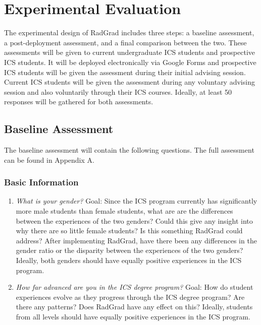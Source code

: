 \chapter{Experimental Evaluation}
\label{experimentalEvaluation}
The experimental design of RadGrad includes three steps: a baseline assessment, a post-deployment assessment, and a final comparison between the two. These assessments will be given to current undergraduate ICS students and prospective ICS students. It will be deployed electronically via Google Forms and prospective ICS students will be given the assessment during their initial advising session. Current ICS students will be given the assessment during any voluntary advising session and also voluntarily through their ICS courses. Ideally, at least 50 responses will be gathered for both assessments.
\section{Baseline Assessment}
\label{baselineAssessment}
	The baseline assessment will contain the following questions. The full assessment can be found in Appendix A. 

\subsection{Basic Information}
\begin{enumerate}
\item \textit{What is your gender? }
Goal: Since the ICS program currently has significantly more male students than female students, what are are the differences between the experiences of the two genders? Could this give any insight into why there are so little female students? Is this something RadGrad could address? After implementing RadGrad, have there been any differences in the gender ratio or the disparity between the experiences of the two genders? Ideally, both genders should have equally positive experiences in the ICS program.
\item \textit{How far advanced are you in the ICS degree program?}
Goal: How do student experiences evolve as they progress through the ICS degree program? Are there any patterns? Does RadGrad have any effect on this? Ideally, students from all levels should have equally positive experiences in the ICS program. 
\end{enumerate}

